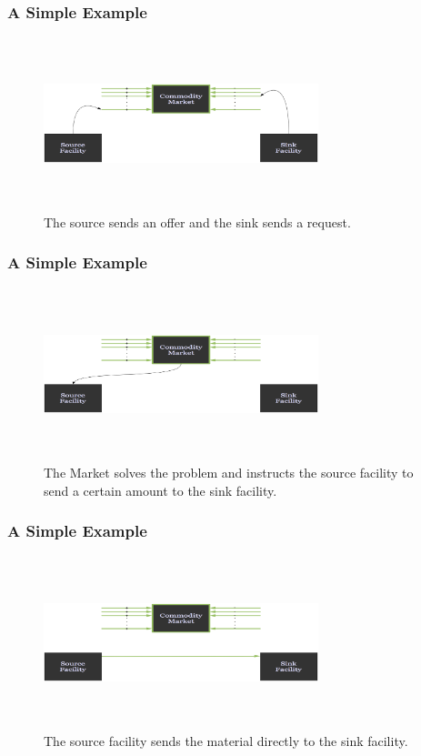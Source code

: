 \begin{frame}[ctb!]
  \frametitle{A Simple Example}
  \begin{figure}[htbp!]
    \begin{center}
      \includegraphics[height=5cm, width=8cm]{offreq.eps}
    \end{center}
    \caption{ The source sends an offer and the sink sends a request.} 
    \label{fig:offreq}
  \end{figure}
\end{frame}
\begin{frame}[ctb!]
  \frametitle{A Simple Example}
  \begin{figure}[htbp!]
    \begin{center}
      \includegraphics[height=5cm, width=8cm]{transmess.eps}
    \end{center}
    \caption{ The Market solves the problem and instructs the source 
    facility to send a certain amount to the sink facility.} 
    \label{fig:transmess}
  \end{figure}
\end{frame}
\begin{frame}[ctb!]
  \frametitle{A Simple Example}
  \begin{figure}[htbp!]
    \begin{center}
      \includegraphics[height=5cm, width=8cm]{trans.eps}
    \end{center}
    \caption{ The source facility sends the material directly to the 
    sink facility.} 
    \label{fig:trans}
  \end{figure}
\end{frame}
